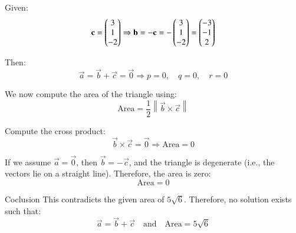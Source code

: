 \documentclass{beamer}
\begin{document}
\begin{frame}
Given:
\begin{equation}
\mathbf{c} = \begin{pmatrix}3 \\ 1 \\ -2\end{pmatrix} 
\Rightarrow \mathbf{b} = -\mathbf{c} = -\begin{pmatrix}3 \\ 1 \\ -2\end{pmatrix}
= \begin{pmatrix}-3 \\ -1 \\ 2\end{pmatrix}
\end{equation}

Then:
\begin{equation}
\vec{a} = \vec{b} + \vec{c} = \vec{0}
\Rightarrow p = 0,\quad q = 0,\quad r = 0
\end{equation}

We now compute the area of the triangle using:
\begin{equation}
\text{Area} = \frac{1}{2} \left\| \vec{b} \times \vec{c} \right\|
\end{equation}

Compute the cross product:
\begin{equation}
\vec{b} \times \vec{c} = \vec{0} \Rightarrow \text{Area} = 0
\end{equation}

If we assume $\vec{a} = \vec{0}$, then $\vec{b} = -\vec{c}$, and the triangle is degenerate (i.e., the vectors lie on a straight line). Therefore, the area is zero:
\begin{equation}
\boxed{\text{Area} = 0}
\end{equation}
\end{frame}
\begin{frame}{Coclusion}
This contradicts the given area of $5\sqrt{6}$. Therefore, no solution exists such that:
\begin{equation}
\vec{a} = \vec{b} + \vec{c} \quad \text{and} \quad \text{Area} = 5\sqrt{6}
\end{equation}
\end{frame}
\end{document}
